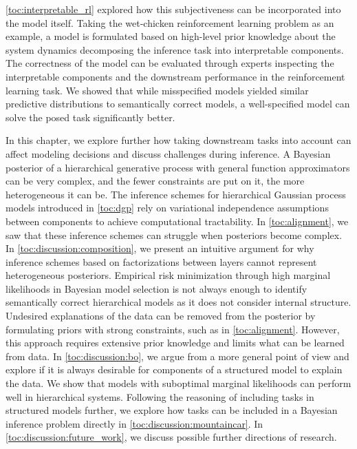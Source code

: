\cref{toc:interpretable_rl} explored how this subjectiveness can be incorporated into the model itself.
Taking the wet-chicken reinforcement learning problem as an example, a model is formulated based on high-level prior knowledge about the system dynamics decomposing the inference task into interpretable components.
The correctness of the model can be evaluated through experts inspecting the interpretable components and the downstream performance in the reinforcement learning task.
We showed that while misspecified models yielded similar predictive distributions to semantically correct models, a well-specified model can solve the posed task significantly better.

In this chapter, we explore further how taking downstream tasks into account can affect modeling decisions and discuss challenges during inference.
A Bayesian posterior of a hierarchical generative process with general function approximators can be very complex, and the fewer constraints are put on it, the more heterogeneous it can be.
The inference schemes for hierarchical Gaussian process models introduced in \cref{toc:dgp} rely on variational independence assumptions between components to achieve computational tractability.
In \cref{toc:alignment}, we saw that these inference schemes can struggle when posteriors become complex.
In \cref{toc:discussion:composition}, we present an intuitive argument for why inference schemes based on factorizations between layers cannot represent heterogeneous posteriors.
Empirical risk minimization through high marginal likelihoods in Bayesian model selection is not always enough to identify semantically correct hierarchical models as it does not consider internal structure.
Undesired explanations of the data can be removed from the posterior by formulating priors with strong constraints, such as in \cref{toc:alignment}.
However, this approach requires extensive prior knowledge and limits what can be learned from data.
In \cref{toc:discussion:bo}, we argue from a more general point of view and explore if it is always desirable for components of a structured model to explain the data.
We show that models with suboptimal marginal likelihoods can perform well in hierarchical systems.
Following the reasoning of including tasks in structured models further, we explore how tasks can be included in a Bayesian inference problem directly in \cref{toc:discussion:mountaincar}.
In \cref{toc:discussion:future_work}, we discuss possible further directions of research.


